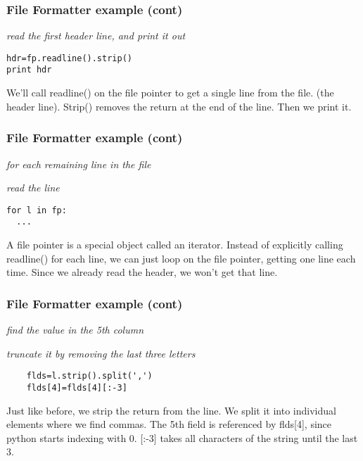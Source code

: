 \documentclass[10pt]{beamer}
\begin{document}
\begin{frame}[fragile]
\frametitle{File Formatter example (cont)}

\textit{read the first header line, and print it out}

\begin{verbatim}
hdr=fp.readline().strip()
print hdr
\end{verbatim}

We'll call readline() on the file pointer to get a single line from the file.
(the header line).  Strip() removes the return at the end of the line.
Then we print it.

\end{frame}

\begin{frame}[fragile]
\frametitle{File Formatter example (cont)}

\textit{for each remaining line in the file}

\textit{read the line}


\begin{verbatim}
for l in fp:
  ...
\end{verbatim}

A file pointer is a special object called an iterator.  Instead of 
explicitly calling readline() for each line, we can just loop on the file 
pointer, getting one line each time. Since we already read the header, we 
won't get that line.

\end{frame}

\begin{frame}[fragile]
\frametitle{File Formatter example (cont)}

\textit{find the value in the 5th column}

\textit{truncate it by removing the last three letters}

\begin{verbatim}
    flds=l.strip().split(',')
    flds[4]=flds[4][:-3]
\end{verbatim}

Just like before, we strip the return from the line.  We split it into
individual elements where we find commas.  The 5th field is referenced by
flds[4], since python starts indexing with 0.  [:-3] takes all characters
of the string until the last 3.
  
\end{frame}
\end{document}
